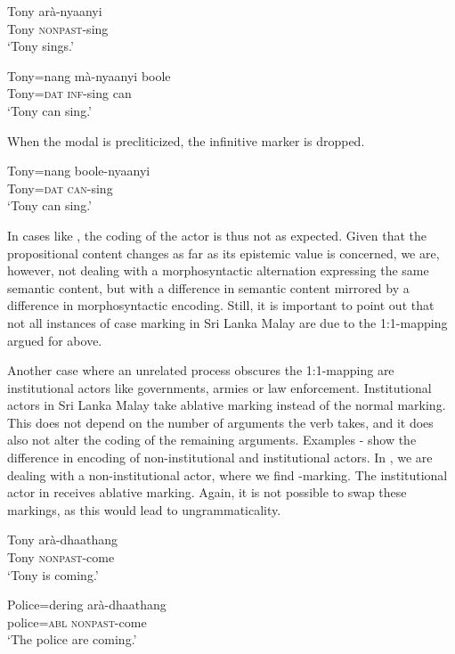 \documentclass[a4paper,10pt]{article}
\begin{document}
\ea\label{ex:modals:boole:noboole}
\gll Tony arà-nyaanyi\\
Tony \textsc{nonpast}-sing\\
`Tony sings.'
\z

\ea\label{ex:modals:boole:boole}
\gll Tony=nang mà-nyaanyi boole\\
Tony=\textsc{dat} \textsc{inf}-sing can\\
`Tony can sing.'
\z

When the modal is precliticized, the infinitive marker is dropped.


\ea 
\gll Tony=nang boole-nyaanyi\\
Tony=\textsc{dat} \textsc{can}-sing\\
`Tony can sing.'
\z

In cases like , the coding of the actor is thus not as expected. Given that the propositional content changes as far as its epistemic value is concerned, we are, however, not dealing with a morphosyntactic alternation expressing the same semantic content, but with a difference in semantic content mirrored by a difference in morphosyntactic encoding. Still, it is important to point out that not all instances of case marking in Sri Lanka Malay are due to the 1:1-mapping argued for above.

Another case where an unrelated process obscures the 1:1-mapping are institutional actors like governments, armies or law enforcement. Institutional actors in Sri Lanka Malay take ablative marking instead of the normal \zero{} marking. This does not depend on the number of arguments the verb takes, and it does also not alter the coding of the remaining arguments. Examples - show the difference in encoding of non-institutional and institutional actors. In , we are dealing with a non-institutional actor, where we find \zero{}-marking. The institutional actor in  receives ablative marking. Again, it is not possible to swap these markings, as this would lead to ungrammaticality.

\ea\label{ex:instit:nom}
\gll Tony arà-dhaathang\\
     Tony \textsc{nonpast}-come\\
    `Tony is coming.' 
\z

\ea\label{ex:instit:abl}
\gll Police=dering arà-dhaathang\\
     police=\textsc{abl} \textsc{nonpast}-come\\
    `The police are coming.' 
\z
\end{document}
